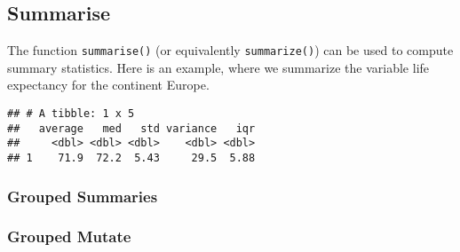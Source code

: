 \documentclass[]{article}
\newenvironment{Shaded}{\begin{snugshade}}{\end{snugshade}}
\newcommand{\KeywordTok}[1]{\textcolor[rgb]{0.13,0.29,0.53}{\textbf{#1}}}
\newcommand{\DataTypeTok}[1]{\textcolor[rgb]{0.13,0.29,0.53}{#1}}
\newcommand{\StringTok}[1]{\textcolor[rgb]{0.31,0.60,0.02}{#1}}
\newcommand{\OperatorTok}[1]{\textcolor[rgb]{0.81,0.36,0.00}{\textbf{#1}}}
\newcommand{\NormalTok}[1]{#1}
\begin{document}
\subsection{Summarise}\label{summarise}

The function \texttt{summarise()} (or equivalently \texttt{summarize()})
can be used to compute summary statistics. Here is an example, where we
summarize the variable life expectancy for the continent Europe.

\begin{Shaded}
\end{Shaded}

\begin{verbatim}
## # A tibble: 1 x 5
##   average   med   std variance   iqr
##     <dbl> <dbl> <dbl>    <dbl> <dbl>
## 1    71.9  72.2  5.43     29.5  5.88
\end{verbatim}

\subsubsection{Grouped Summaries}\label{grouped-summaries}

\subsubsection{Grouped Mutate}\label{grouped-mutate}
\end{document}
